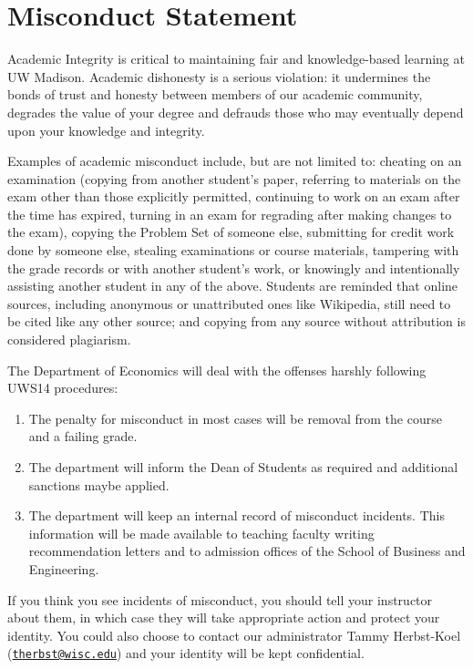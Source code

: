 \documentclass[
]{book}
\begin{document}
\hypertarget{misconduct-statement}{%
\section{Misconduct Statement}\label{misconduct-statement}}

Academic Integrity is critical to maintaining fair and knowledge-based learning at UW Madison. Academic dishonesty is a serious violation: it undermines the bonds of trust and honesty between members of our academic community, degrades the value of your degree and defrauds those who may eventually depend upon your knowledge and integrity.

Examples of academic misconduct include, but are not limited to: cheating on an examination (copying from another student's paper, referring to materials on the exam other than those explicitly permitted, continuing to work on an exam after the time has expired, turning in an exam for regrading after making changes to the exam), copying the Problem Set of someone else, submitting for credit work done by someone else, stealing examinations or course materials, tampering with the grade records or with another student's work, or knowingly and intentionally assisting another student in any of the above. Students are reminded that online sources, including anonymous or unattributed ones like Wikipedia, still need to be cited like any other source; and copying from any source without attribution is considered plagiarism.

The Department of Economics will deal with the offenses harshly following UWS14 procedures:

\begin{enumerate}
\def\labelenumi{\arabic{enumi}.}
\item
  The penalty for misconduct in most cases will be removal from the course and a failing grade.
\item
  The department will inform the Dean of Students as required and additional sanctions maybe applied.
\item
  The department will keep an internal record of misconduct incidents. This information will be made available to teaching faculty writing recommendation letters and to admission offices of the School of Business and Engineering.
\end{enumerate}

If you think you see incidents of misconduct, you should tell your instructor about them, in which case they will take appropriate action and protect your identity. You could also choose to contact our administrator Tammy Herbst-Koel (\href{mailto:therbst@wisc.edu}{\nolinkurl{therbst@wisc.edu}}) and your identity will be kept confidential.
\end{document}
